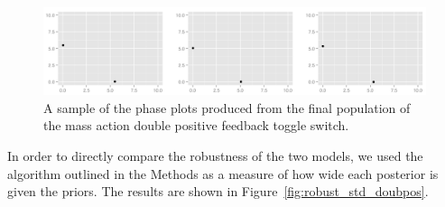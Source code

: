 \begin{figure}[p]
\centering
\includegraphics[scale=0.3]{chapterModelling/images/ma_dp_bi_phase_plot.png}
\caption{A sample of the phase plots produced from the final population of the mass action double positive feedback toggle switch.}
\label{fig:det_dp_phase}
\end{figure}
\clearpage
In order to directly compare the robustness of the two models, we used the algorithm outlined in the Methods as a measure of how wide each posterior is given the priors. The results are shown in Figure~\ref{fig:robust_std_doubpos}. 


